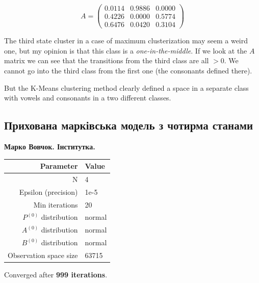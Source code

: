 \documentclass[12pt,a4paper]{article}
\begin{document}
  \[ A = \begin{pmatrix}
      0.0114 & 0.9886 & 0.0000 \\
      0.4226 & 0.0000 & 0.5774 \\
      0.6476 & 0.0420 & 0.3104
    \end{pmatrix}  \] 

  The third state cluster in a case of maximum clusterization may seem a weird one,
  but my opinion is that this class is a \textit{one-in-the-middle}. If we look at the
  $A$ matrix we can see that the transitions from the third class are all $> 0$.
  We cannot go into the third class from the first one (the consonants
  defined there).

  But the K-Means clustering method clearly defined a space in a separate class
  with vowels and consonants in a two different classes.

  \clearpage


  \subsection{Прихована марківська модель з чотирма станами}


  \textbf{Марко Вовчок. Інститутка.}

  \begin{center}
  \begin{tabular}{ | r | l | }
    \hline
    Parameter & Value \\
    \hline
    N & 4 \\
    \hline
    Epsilon (precision) & 1e-5 \\
    \hline
    Min iterations & 20 \\
    \hline
    $P^{(0)}$ distribution & normal \\
    \hline
    $A^{(0)}$ distribution & normal \\
    \hline
    $B^{(0)}$ distribution & normal \\
    \hline
    Observation space size & 63715 \\
    \hline
  \end{tabular}
  \end{center}

  Converged after \textbf{999 iterations}.
\end{document}
